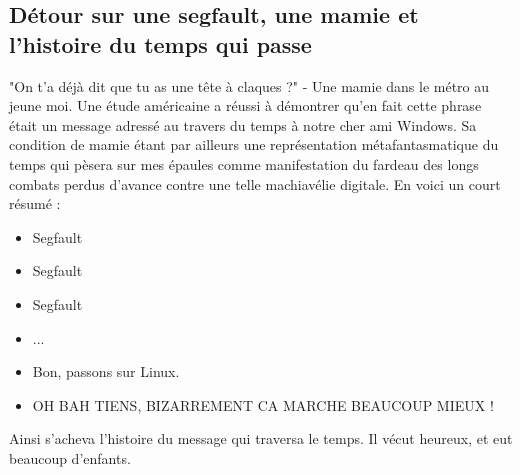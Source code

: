 \documentclass{article}
\begin{document}
\subsection{Détour sur une segfault, une mamie et l'histoire du temps qui passe}
"On t'a déjà dit que tu as une tête à claques ?" - Une mamie dans le métro au jeune moi. Une étude américaine a réussi à démontrer qu'en fait cette phrase était un message adressé au travers du temps à notre cher ami Windows. Sa condition de mamie étant par ailleurs une représentation métafantasmatique du temps qui pèsera sur mes épaules comme manifestation du fardeau des longs combats perdus d'avance contre une telle machiavélie digitale. En voici un court résumé :\newline
\begin{itemize}
\item Segfault
\item Segfault
\item Segfault
\item ...
\item Bon, passons sur Linux.
\item OH BAH TIENS, BIZARREMENT CA MARCHE BEAUCOUP MIEUX !
\end{itemize}

Ainsi s'acheva l'histoire du message qui traversa le temps. Il vécut heureux, et eut beaucoup d'enfants.
\end{document}
